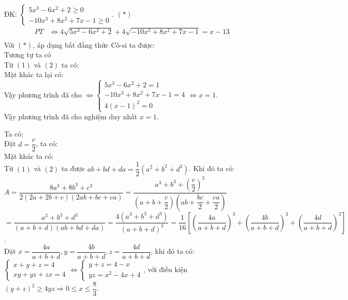 \lgi
ĐK: $\begin{cases} 5x^3-6x^2+2\ge 0\\ -10x^3+8x^2+7x-1\ge 0  \end{cases}$. $(*)$\\
\begin{eqnarray*}
PT&\iff 4\sqrt{5x^3-6x^2+2}+4\sqrt{-10x^3+8x^2+7x-1}=x-13\\
\end{eqnarray*}
Với $(*)$, áp dụng bất đẳng thức Cô-si ta được:\\
Tương tự ta có\\
Từ $(1)$ và $(2)$ ta có:\\
Mặt khác ta lại có:\\
Vậy phương trình đã cho $\iff \begin{cases} 5x^3-6x^2+2=1\\    -10x^3+8x^2+7x-1=4 \\ 4(x-1)^2=0 \end{cases}\iff x=1$.\\
Vậy phương trình đã cho nghiệm duy nhất $x=1$.


\lgi
Ta có:\\
Đặt $d=\dfrac{c}{2}$, ta có:\\
Mặt khác ta có:\\
Từ $(1)$ và $(2)$ ta được $ab+bd+da=\dfrac{1}{2}(a^2+b^2+d^2)$.
Khi đó ta có:\\
$A=\dfrac{8a^3+8b^3+c^3}{2(2a+2b+c)(2ab+bc+ca)}
=\dfrac{a^3+b^3+\left(\dfrac{c}{2}\right)^3}{\left(a+b+\dfrac{c}{2}\right)\left(ab+\dfrac{bc}{2}+\dfrac{ca}{2}\right)}$\\
$=\dfrac{a^3+b^3+d^3}{(a+b+d)(ab+bd+da)}=\dfrac{4(a^3+b^3+d^3)}{(a+b+d)^3}=\dfrac{1}{16}\left[ \left( \dfrac{4a}{a+b+d} \right)^3+\left(\dfrac{4b}{a+b+d}\right)^3+\left(\dfrac{4d}{a+b+d}\right)^3 \right]$.\\
Đặt $x=\dfrac{4a}{a+b+d},y=\dfrac{4b}{a+b+d},z=\dfrac{4d}{a+b+d}$, khi đó ta có:\\
$\begin{cases}
x+y+z=4 \\ xy+yz+zx=4
\end{cases}\iff \begin{cases} y+z=4-x \\ yz=x^2-4x+4 \end{cases}$, với điều kiện $(y+z)^2\ge 4yz\Rightarrow 0\le x\le \dfrac{8}{3}$.

